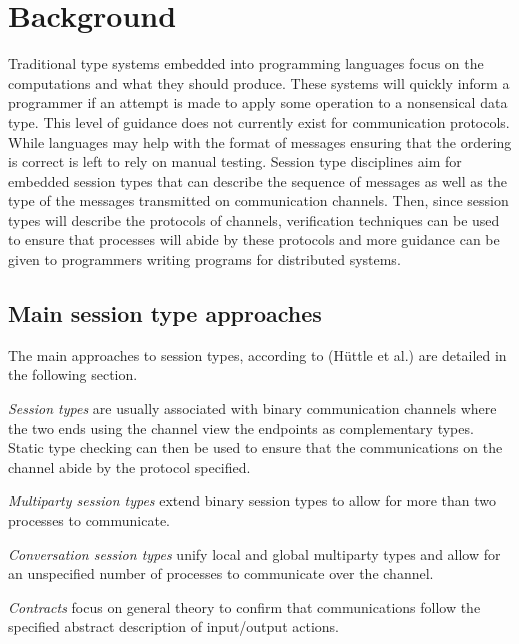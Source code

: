 \section{Background}
Traditional type systems embedded into programming languages focus on the computations and what they should produce. These systems will quickly inform a programmer if an attempt is made to apply some operation to a nonsensical data type. This level of guidance does not currently exist for communication protocols. While languages may help with the format of messages ensuring that the ordering is correct is left to rely on manual testing. Session type disciplines aim for embedded session types that can describe the sequence of messages as well as the type of the messages transmitted on communication channels. Then, since session types will describe the protocols of channels, verification techniques can be used to ensure that processes will abide by these protocols and more guidance can be given to programmers writing programs for distributed systems.

\subsection{Main session type approaches}
The main approaches to session types, according to (H\"{u}ttle et al.) \cite{foundBTypes} are detailed in the following section.

\textit{Session types} are usually associated with binary communication channels where the two ends using the channel view the endpoints as complementary types. Static type checking can then be used to ensure that the communications on the channel abide by the protocol specified. 

\textit{Multiparty session types} extend binary session types to allow for more than two processes to communicate. 

\textit{Conversation session types} unify local and global multiparty types and allow for an unspecified number of processes to communicate over the channel. 

\textit{Contracts} focus on general theory to confirm that communications follow the specified abstract description of input/output actions.

